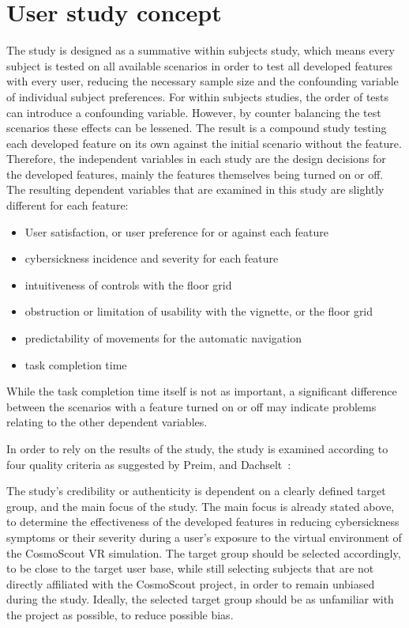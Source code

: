 \section{User study concept}\label{sec:user-study-concept}

The study is designed as a summative within subjects study, which means every subject is tested on all available
scenarios in order to test all developed features with every user, reducing the necessary sample size and the
confounding variable of individual subject preferences.
For within subjects studies, the order of tests can introduce a confounding variable.
However, by counter balancing the test scenarios these effects can be lessened.
The result is a compound study testing each developed feature on its own against the initial scenario without the
feature.
Therefore, the independent variables in each study are the design decisions for the developed features, mainly the
features themselves being turned on or off.
The resulting dependent variables that are examined in this study are slightly different for each feature:
\begin{itemize}
    \item User satisfaction, or user preference for or against each feature
    \item cybersickness incidence and severity for each feature
    \item intuitiveness of controls with the floor grid
    \item obstruction or limitation of usability with the vignette, or the floor grid
    \item predictability of movements for the automatic navigation
    \item task completion time
\end{itemize}
While the task completion time itself is not as important, a significant difference between the scenarios with a
feature turned on or off may indicate problems relating to the other dependent variables.

In order to rely on the results of the study, the study is examined according to four quality criteria as suggested 
by Preim, and Dachselt~\cite{Preim2015}:

The study's credibility or authenticity is dependent on a clearly defined target group, and the main focus of the study.
The main focus is already stated above, to determine the effectiveness of the developed features in reducing
cybersickness symptoms or their severity during a user's exposure to the virtual environment of the CosmoScout VR
simulation.
The target group should be selected accordingly, to be close to the target user base, while still selecting subjects
that are not directly affiliated with the CosmoScout project, in order to remain unbiased during the study.
Ideally, the selected target group should be as unfamiliar with the project as possible, to reduce possible bias.

